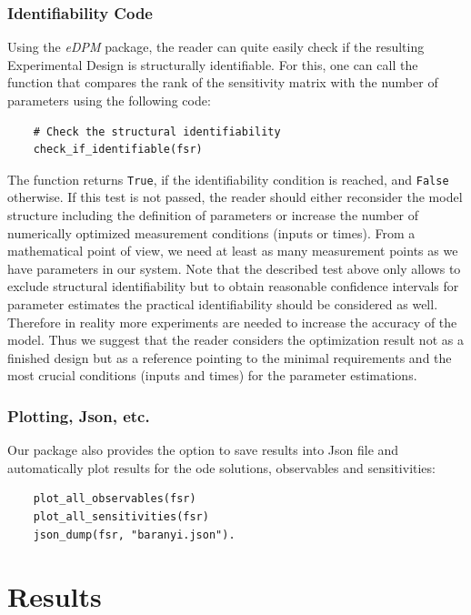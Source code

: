 \documentclass[10pt,A4paper]{article}
\begin{document}
\subsubsection*{Identifiability Code}
Using the {\it eDPM} package, the reader can quite easily check if the resulting Experimental Design is structurally identifiable.
For this, one can call the function that compares the rank of the sensitivity matrix with the number of parameters using the following code:
\begin{verbatim}
    # Check the structural identifiability
    check_if_identifiable(fsr)
\end{verbatim}
The function returns \texttt{True}, if the identifiability condition is reached, and \texttt{False} otherwise.
If this test is not passed, the reader should either reconsider the model structure including the definition of parameters or increase the number of numerically optimized measurement conditions (inputs or times).
From a mathematical point of view, we need at least as many measurement points as we have parameters in our system.
Note that the described test above only allows to exclude structural identifiability but to obtain reasonable confidence intervals for parameter estimates the practical identifiability should be considered as well.
Therefore in reality more experiments are needed to increase the accuracy of the model.
Thus we suggest that the reader considers the optimization result not as a finished design but as a reference pointing to the minimal requirements and the most crucial conditions (inputs and times) for the parameter estimations.
%
\subsubsection*{Plotting, Json, etc.}
Our package also provides the option to save results into Json file and automatically plot results for the ode solutions, observables and sensitivities:
\begin{verbatim}
    plot_all_observables(fsr)
    plot_all_sensitivities(fsr)
    json_dump(fsr, "baranyi.json").
\end{verbatim}
%
%
%
\section*{Results}
\end{document}
